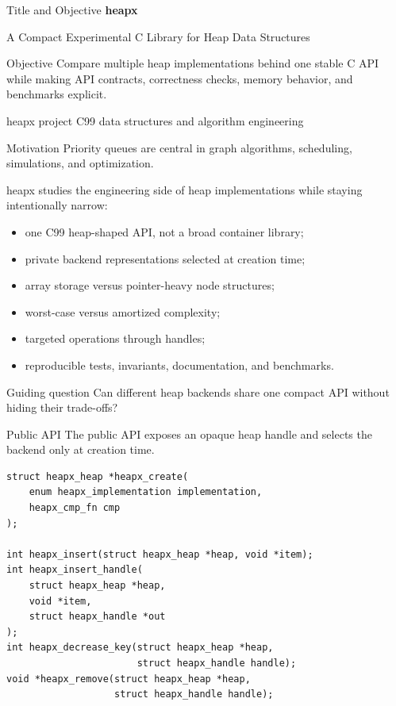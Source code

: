 \documentclass[10pt,aspectratio=43]{beamer}
\title{\projecttitle}
\subtitle{\projectsubtitle}
\author{heapx project}
\institute{C99 data structures and algorithm engineering}
\date{\today}
\newcommand{\projecttitle}{heapx}
\newcommand{\projectsubtitle}{A Compact Experimental C Library for Heap Data Structures}
\begin{document}
\begin{frame}{Title and Objective}
    \vspace{0.4em}
    {\Large\bfseries\color{projectblue}\projecttitle}

    \vspace{0.4em}
    {\large \projectsubtitle}

    \vspace{1.1em}
    \begin{block}{Objective}
        Compare multiple heap implementations behind one stable C API while making API contracts, correctness checks, memory behavior, and benchmarks explicit.
    \end{block}

    \vfill
    \small heapx project \hfill C99 data structures and algorithm engineering
\end{frame}

\begin{frame}{Motivation}
    Priority queues are central in graph algorithms, scheduling, simulations, and optimization.

    \vspace{0.5em}
    heapx studies the engineering side of heap implementations while staying intentionally narrow:
    \begin{itemize}
        \item one C99 heap-shaped API, not a broad container library;
        \item private backend representations selected at creation time;
        \item array storage versus pointer-heavy node structures;
        \item worst-case versus amortized complexity;
        \item targeted operations through handles;
        \item reproducible tests, invariants, documentation, and benchmarks.
    \end{itemize}

    \vspace{0.4em}
    \begin{block}{Guiding question}
        Can different heap backends share one compact API without hiding their trade-offs?
    \end{block}
\end{frame}

\begin{frame}[fragile]{Public API}
    The public API exposes an opaque heap handle and selects the backend only at creation time.

    \begin{lstlisting}[style=cstyle]
struct heapx_heap *heapx_create(
    enum heapx_implementation implementation,
    heapx_cmp_fn cmp
);

int heapx_insert(struct heapx_heap *heap, void *item);
int heapx_insert_handle(
    struct heapx_heap *heap,
    void *item,
    struct heapx_handle *out
);
int heapx_decrease_key(struct heapx_heap *heap,
                       struct heapx_handle handle);
void *heapx_remove(struct heapx_heap *heap,
                   struct heapx_handle handle);
    \end{lstlisting}
\end{frame}
\end{document}

